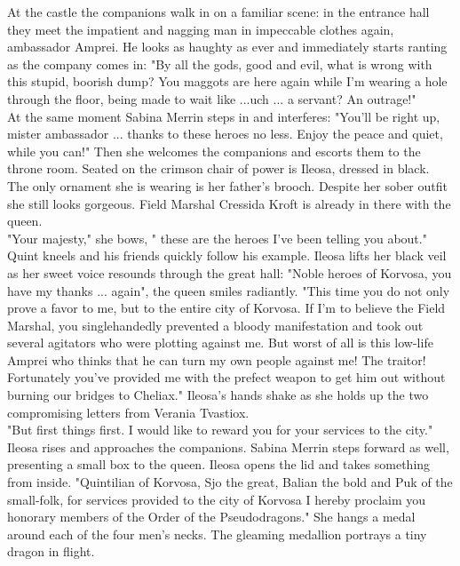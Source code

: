 At the castle the companions walk in on a familiar scene: in the entrance hall they meet the impatient and nagging man in impeccable clothes again, ambassador Amprei. He looks as haughty as ever and immediately starts ranting as the company comes in: "By all the gods, good and evil, what is wrong with this stupid, boorish dump? You maggots are here again while I'm wearing a hole through the floor, being made to wait like ...uch ... a servant? An outrage!"\\

At the same moment Sabina Merrin steps in and interferes: "You'll be right up, mister ambassador ... thanks to these heroes no less. Enjoy the peace and quiet, while you can!" Then she welcomes the companions and escorts them to the throne room. Seated on the crimson chair of power is Ileosa, dressed in black. The only ornament she is wearing is her father's brooch. Despite her sober outfit she still looks gorgeous. Field Marshal Cressida Kroft is already in there with the queen.\\

"Your majesty," she bows, " these are the heroes I've been telling you about." Quint kneels and his friends quickly follow his example. Ileosa lifts her black veil as her sweet voice resounds through the great hall: "Noble heroes of Korvosa, you have my thanks ... again", the queen smiles radiantly. "This time you do not only prove a favor to me, but to the entire city of Korvosa. If I'm to believe the Field Marshal, you singlehandedly prevented a bloody manifestation and took out several agitators who were plotting against me. But worst of all is this low-life Amprei who thinks that he can turn my own people against me! The traitor! Fortunately you've provided me with the prefect weapon to get him out without burning our bridges to Cheliax." Ileosa's hands shake as she holds up the two compromising letters from Verania Tvastiox.\\

"But first things first. I would like to reward you for your services to the city." Ileosa rises and approaches the companions. Sabina Merrin steps forward as well, presenting a small box to the queen. Ileosa opens the lid and takes something from inside. "Quintilian of Korvosa, Sjo the great, Balian the bold and Puk of the small-folk, for services provided to the city of Korvosa I hereby proclaim you honorary members of the Order of the Pseudodragons." She hangs a medal around each of the four men's necks. The gleaming medallion portrays a tiny dragon in flight.\\

